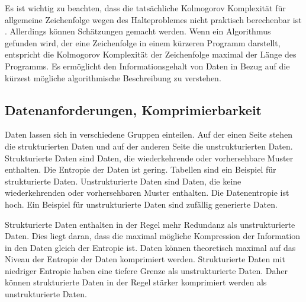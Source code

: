 \documentclass[conference]{IEEEtran}
\begin{document}
Es ist wichtig zu beachten, dass die tatsächliche Kolmogorov Komplexität für
allgemeine Zeichenfolge wegen des Halteproblemes nicht praktisch
berechenbar ist \cite{OPPaper}. 
Allerdings können Schätzungen gemacht werden.
Wenn ein Algorithmus gefunden wird, der eine Zeichenfolge in einem kürzeren
Programm darstellt, entspricht die Kolmogorov Komplexität der Zeichenfolge
maximal der Länge des Programms.
Es ermöglicht den Informationsgehalt von Daten in
Bezug auf die kürzest mögliche algorithmische Beschreibung zu verstehen.


\subsection{Datenanforderungen, Komprimierbarkeit}

Daten lassen sich in verschiedene Gruppen einteilen. 
Auf der einen Seite stehen die strukturierten Daten und auf der anderen 
Seite die unstrukturierten Daten. 
Strukturierte Daten sind Daten, die wiederkehrende oder vorhersehbare Muster enthalten. 
Die Entropie der Daten ist gering. Tabellen sind ein Beispiel für strukturierte Daten. 
Unstrukturierte Daten sind Daten, die keine wiederkehrenden oder vorhersehbaren 
Muster enthalten. Die Datenentropie ist hoch. 
Ein Beispiel für unstrukturierte Daten sind zufällig generierte Daten. 

Strukturierte Daten enthalten in der Regel mehr Redundanz als unstrukturierte Daten. 
Dies liegt daran, dass die maximal mögliche Kompression der Information in den Daten 
gleich der Entropie ist. 
Daten können theoretisch maximal auf das Niveau der Entropie der Daten komprimiert werden.
Strukturierte Daten mit niedriger Entropie haben eine tiefere Grenze als 
unstrukturierte Daten.
Daher können strukturierte Daten in der Regel stärker komprimiert werden als 
unstrukturierte Daten.
\end{document}
